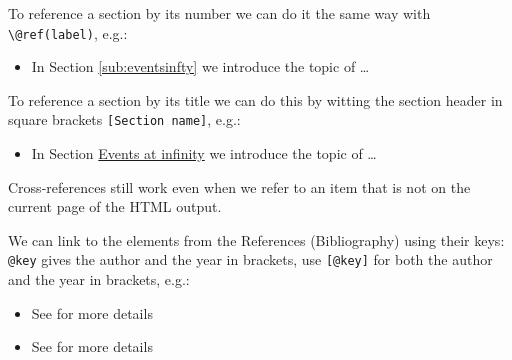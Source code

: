 \documentclass[
]{book}
\providecommand{\tightlist}{%
  \setlength{\itemsep}{0pt}\setlength{\parskip}{0pt}}
\theoremstyle{definition}
\theoremstyle{remark}
\begin{document}
To reference a section by its number we can do it the same way with \texttt{\textbackslash{}@ref(label)}, e.g.:

\begin{itemize}
\tightlist
\item
  In Section \ref{sub:eventsinfty} we introduce the topic of \ldots{}
\end{itemize}

To reference a section by its title we can do this by witting the section
header in square brackets \texttt{{[}Section\ name{]}}, e.g.:

\begin{itemize}
\tightlist
\item
  In Section \protect\hyperlink{sub:eventsinfty}{Events at infinity} we introduce the topic of \ldots{}
\end{itemize}

Cross-references still work even when we refer to an item that is not on the
current page of the HTML output.

We can link to the elements from the References (Bibliography) using their keys:
\texttt{@key} gives the author and the year in brackets, use \texttt{{[}@key{]}} for both the
author and the year in brackets, e.g.:

\begin{itemize}
\tightlist
\item
  See \citet{Cohn13} for more details
\item
  See \citep{Cohn13} for more details
\end{itemize}

\backmatter

  
\end{document}
